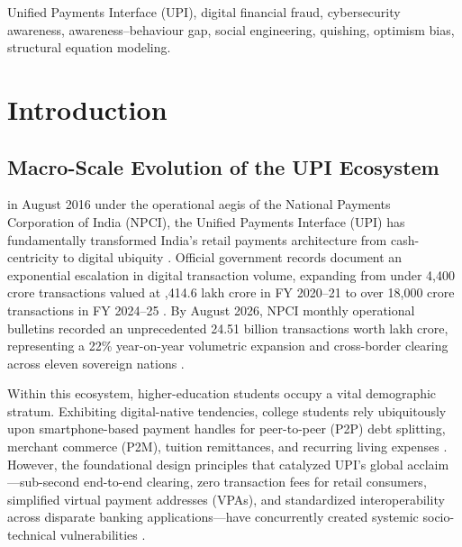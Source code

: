 \documentclass[journal,10pt,twocolumn]{IEEEtran}
\begin{document}
\begin{IEEEkeywords}
Unified Payments Interface (UPI), digital financial fraud, cybersecurity awareness, awareness--behaviour gap, social engineering, quishing, optimism bias, structural equation modeling.
\end{IEEEkeywords}

\IEEEpeerreviewmaketitle

\section{Introduction}

\subsection{Macro-Scale Evolution of the UPI Ecosystem}
 in August 2016 under the operational aegis of the National Payments Corporation of India (NPCI), the Unified Payments Interface (UPI) has fundamentally transformed India's retail payments architecture from cash-centricity to digital ubiquity \cite{aicte2022}. Official government records document an exponential escalation in digital transaction volume, expanding from under 4,400 crore transactions valued at ,414.6 lakh crore in FY 2020--21 to over 18,000 crore transactions in FY 2024--25 \cite{bs_vol2025, pib_surge2025}. By August 2026, NPCI monthly operational bulletins recorded an unprecedented 24.51 billion transactions worth  lakh crore, representing a 22\% year-on-year volumetric expansion and cross-border clearing across eleven sovereign nations \cite{bs_record2026}.

Within this ecosystem, higher-education students occupy a vital demographic stratum. Exhibiting digital-native tendencies, college students rely ubiquitously upon smartphone-based payment handles for peer-to-peer (P2P) debt splitting, merchant commerce (P2M), tuition remittances, and recurring living expenses \cite{karkera2024, roy2026}. However, the foundational design principles that catalyzed UPI's global acclaim---sub-second end-to-end clearing, zero transaction fees for retail consumers, simplified virtual payment addresses (VPAs), and standardized interoperability across disparate banking applications---have concurrently created systemic socio-technical vulnerabilities \cite{exploratio2026, sharma2024}.
\end{document}
